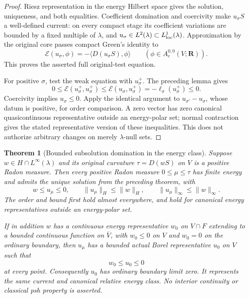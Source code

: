 \documentclass[11pt,a4paper]{article}
\numberwithin{equation}{section}
\newtheorem{theorem}{Theorem}[section]
\theoremstyle{definition}
\theoremstyle{remark}
\begin{document}
\begin{proof}
Riesz representation in the energy Hilbert space gives the solution,
uniqueness, and both equalities. Coefficient domination and coercivity
make $u_\sigma S$ a well-defined current: on every compact stage its
coefficient variations are bounded by a fixed multiple of $\lambda$,
and $u_\sigma\in L^2(\lambda)\subset L^1_{\rm loc}(\lambda)$.
Approximation by the original core passes compact Green's identity to
\[
 \mathcal E(u_\sigma,\phi)
          =-\langle D(u_\sigma S),\phi\rangle
                         \qquad(\phi\in A_c^{0,0}(V;\mathbf R)).
\]
This proves the asserted full original-test equation.

For positive $\sigma$, test the weak equation with $u_\sigma^+$.
The preceding lemma gives
\[
 0\le\mathcal E(u_\sigma^+,u_\sigma^+)
 \le\mathcal E(u_\sigma,u_\sigma^+)
                  =-\ell_\sigma(u_\sigma^+)\le0.
\]
Coercivity implies $u_\sigma\le0$. Apply the identical argument to
$u_{\sigma'}-u_\sigma$, whose datum is positive, for order comparison.
A zero vector has zero canonical quasicontinuous representative outside
an energy-polar set; normal contraction gives the stated representative
version of these inequalities. This does not authorize arbitrary
changes on merely $\lambda$-null sets.
\end{proof}

\begin{theorem}[Bounded subsolution domination in the energy class]
\label{thm:r6-bounded-energy-subsolution}
Suppose $w\in H\cap L^\infty(\lambda)$ and its original curvature
$\tau=D(wS)$ on $V$ is a positive Radon measure. Then every positive
Radon measure $0\le\mu\le\tau$ has finite energy and admits the unique
solution from the preceding theorem, with
\[
                w\le u_\mu\le0,\qquad
                \|u_\mu\|_H\le\|w\|_H,\qquad
                \|u_\mu\|_\infty\le\|w\|_\infty.
\]
The order and bound first hold almost everywhere, and hold for canonical
energy representatives outside an energy-polar set.

If in addition $w$ has a continuous energy representative $w_0$ on
$V\cap F$ extending to a bounded continuous function on $\overline V$,
with $w_0\le0$ on $V$ and $w_0=0$ on the ordinary boundary, then
$u_\mu$ has a bounded actual Borel representative $u_0$ on $V$ such
that
\[
                       w_0\le u_0\le0
\]
at every point. Consequently $u_0$ has ordinary boundary limit zero.
It represents the same current and canonical relative energy class.
No interior continuity or classical psh property is asserted.
\end{theorem}
\end{document}
